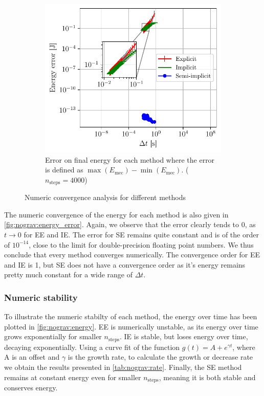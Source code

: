 \begin{figure}[h]
\begin{subfigure}{0.45\linewidth}
        \includegraphics[width=\linewidth]{figures/nograv_energy_error_all.pdf}
        \caption{Error on final energy for each method where the error is defined as $\max(E_\textrm{mec}) - \min(E_\textrm{mec}).$ ($n_\textrm{steps}=4000$)}
        \label{fig:nograv:energy_error}
    \end{subfigure}
    \caption{Numeric convergence analysis for different methods}
\end{figure}

The numeric convergence of the energy for each method is also given in \autoref{fig:nograv:energy_error}. Again, we observe that the error clearly tends to 0, as $t \rightarrow 0$ for EE and IE. The error for SE remains quite constant and is of the order of $10^{-14}$, close to the limit for double-precision floating point numbers. We thus conclude that every method converges numerically. The convergence order for EE and IE is 1, but SE does not have a convergence order as it's energy remains pretty much constant for a wide range of $\Delta t$.

\subsubsection{Numeric stability}

To illustrate the numeric stabilty of each method, the energy over time has been plotted in \autoref{fig:nograv:energy}. EE is numerically unstable, as its energy over time grows exponentially for smaller $n_\textrm{steps}$. IE is stable, but loses energy over time, decaying exponentially. Using a curve fit of the function $g(t) = A + e^{\gamma t}$, where A is an offset and $\gamma$ is the growth rate, to calculate the growth or decrease rate we obtain the results presented in \autoref{tab:nograv:rate}. Finally, the SE method remains at constant energy even for smaller $n_\textrm{steps}$, meaning it is both stable and conserves energy.

